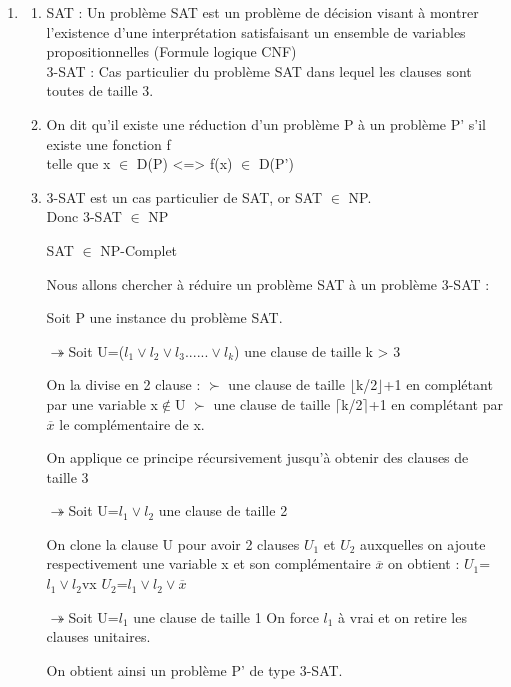 \documentclass[]{article}
\begin{document}
\begin{enumerate}
\item 
  \begin{enumerate}
  \item
    SAT : Un  problème SAT est un problème de décision visant à montrer l'existence d'une interprétation satisfaisant un ensemble de variables propositionnelles (Formule logique CNF)\\
    3-SAT : Cas particulier du problème SAT dans lequel les clauses sont toutes de taille 3.\\

  \item
    On dit qu'il existe une réduction d'un problème P à un problème P' s'il existe une fonction f\\
    telle que x $\in$ D(P) <=> f(x) $\in$ D(P')\\

  \item
    3-SAT est un cas particulier de SAT, or SAT $\in$ NP.\\
    Donc 3-SAT $\in$ NP

    SAT $\in$ NP-Complet

    Nous allons chercher à réduire un problème SAT à un problème 3-SAT : 

    Soit P une instance du problème SAT.
    
    $\twoheadrightarrow$Soit U=($l_1 \vee l_2 \vee l_3......\vee l_k$) une clause de taille k > 3

    On la divise en 2 clause :
    $\succ$ une clause de taille $\lfloor$k/2$\rfloor$+1 en complétant par une variable x$\notin$U 
    $\succ$ une clause de taille $\lceil$k/2$\rceil$+1 en complétant par $\overline x$ le complémentaire de x.

    On applique ce principe récursivement jusqu'à obtenir des clauses de taille 3

    $\twoheadrightarrow$Soit U={$l_1 \vee l_2$} une clause de taille 2
    
    On clone la clause U pour avoir 2 clauses $U_1$ et $U_2$ auxquelles on ajoute respectivement une variable x et son complémentaire $\overline x$
    on obtient :  $U_1$={$l_1 \vee l_2$vx}
    $U_2$={$l_1 \vee l_2 \vee \overline x$}

    $\twoheadrightarrow$Soit U={$l_1$} une clause de taille 1
    On force $l_1$ à vrai et on retire les clauses unitaires.

    On obtient ainsi un problème P' de type 3-SAT.    


\end{enumerate}
\end{enumerate}
\end{document}
